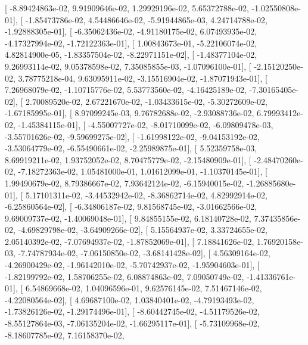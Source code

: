 \documentclass{article}
\begin{document}
       [ -8.89424863e-02,   9.91909646e-02,   1.29929196e-02,
          5.65372788e-02,  -1.02550808e-01],
       [ -1.85473786e-02,   4.54486646e-02,  -5.91944865e-03,
          4.24714788e-02,  -1.92888305e-01],
       [ -6.35062436e-02,  -4.91180175e-02,   6.07493935e-02,
         -4.17327994e-02,  -1.72122363e-01],
       [  1.00843673e-01,  -5.22106074e-02,   4.82814900e-05,
         -1.83357504e-02,  -8.22971151e-02],
       [ -1.48377104e-02,   9.26993114e-02,   9.05378598e-02,
          7.35085855e-03,  -1.07096100e-01],
       [ -2.15120250e-02,   3.78775218e-04,   9.63095911e-02,
         -3.15516904e-02,  -1.87071943e-01],
       [  7.26968079e-02,  -1.10715776e-02,   5.53773560e-02,
         -4.16425189e-02,  -7.30165405e-02],
       [  2.70089520e-02,   2.67221670e-02,  -1.03433615e-02,
         -5.30272609e-02,  -1.67185995e-01],
       [  8.97099245e-03,   9.76782688e-02,  -2.93088736e-02,
          6.79993412e-02,  -1.45384115e-01],
       [ -4.55007727e-02,  -8.01710099e-02,  -6.09809478e-03,
         -3.55701626e-02,  -9.59699275e-02],
       [ -1.61998122e-02,  -9.04153192e-02,  -3.53064779e-02,
         -6.55490661e-02,  -2.25989875e-01],
       [  5.52359758e-03,   8.69919211e-02,   1.93752052e-02,
          8.70475779e-02,  -2.15480909e-01],
       [ -2.48470260e-02,  -7.18272363e-02,   1.05481000e-01,
          1.01612099e-01,  -1.10370145e-01],
       [  1.99490679e-02,   8.79386667e-02,   7.93642124e-02,
         -6.15940015e-02,  -1.26885680e-01],
       [  5.17101311e-02,  -3.44532942e-02,  -8.36862714e-02,
          4.82992914e-02,  -6.25860564e-02],
       [ -6.34806187e-02,   9.81568745e-02,  -3.01662566e-02,
          9.69009737e-02,  -1.40069048e-01],
       [  9.84855155e-02,   6.18140728e-02,   7.37435856e-02,
         -4.69829798e-02,  -3.64909266e-02],
       [  5.15564937e-02,   3.33724655e-02,   2.05140392e-02,
         -7.07694937e-02,  -1.87852069e-01],
       [  7.18841626e-02,   1.76920158e-03,  -7.74787934e-02,
         -7.06150850e-02,  -3.68141428e-02],
       [  4.56309164e-02,  -4.26900429e-02,  -1.96142010e-02,
         -5.70742937e-02,  -1.95904603e-01],
       [ -1.82199792e-02,   1.58706255e-02,   6.08874863e-02,
          7.09050749e-02,  -1.41336761e-01],
       [  6.54869668e-02,   1.04096596e-01,   9.62576145e-02,
          7.51467146e-02,  -4.22080564e-02],
       [  4.69687100e-02,   1.03840401e-02,  -4.79193493e-02,
         -1.73826126e-02,  -1.29174496e-01],
       [ -8.60442745e-02,  -4.51179526e-02,  -8.55127864e-03,
         -7.06135204e-02,  -1.66295117e-01],
       [ -5.73109968e-02,  -8.18607785e-02,   7.16158370e-02,
\end{document}

